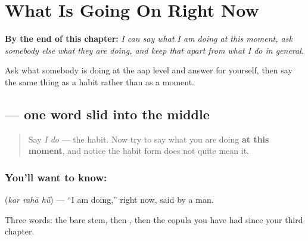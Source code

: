
\chapter{What Is Going On Right Now}
\label{ch:hi-jaari}

\begin{chapteropening}
\textbf{By the end of this chapter:} \emph{I can say what I am doing at this moment, ask somebody else what they are doing, and keep that apart from what I do in general.}

Ask what somebody is doing at the aap level and answer for yourself, then say the same thing as a habit rather than as a moment.
\end{chapteropening}

\section[\texorpdfstring{\hi{कर} \hi{रहा} \hi{हूँ} (kar rahā hū̃)}{कर रहा हूँ (kar rahā hū̃)}]{   — one word slid into the middle}

\label{lesson:HI-C89-kar-raha-hun}



\begin{quote}
Say \emph{I do} — the habit. Now try to say what you are doing \textbf{at this moment}, and notice the habit form does not quite mean it.
\end{quote}

\subsection*{You'll want to know:   }
\textbf{  } (\emph{kar rahā hū̃}) — \textquotedblleft{}I am doing,\textquotedblright{} right now, said by a man.

Three words: the bare stem, then \textbf{}, then the copula you have had since your third chapter.

